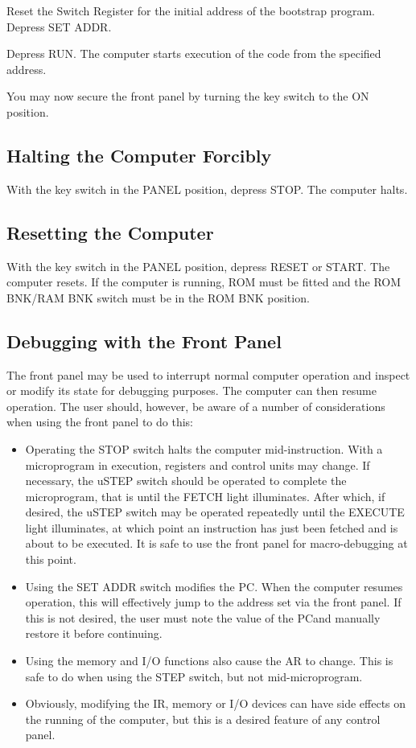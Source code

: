 \documentclass[11pt,a4paper,twocolumns]{article}
\newcommand{\lt}[1]{\textsf{#1}}
\newcommand{\sw}[1]{\textsf{#1}}
\newcommand\register[1]{\textsf{#1}}
\newcommand\MAR{\register{AR}}
\newcommand\PC{\register{PC}}
\newcommand\IR{\register{IR}}
\begin{document}
Reset the Switch Register for the initial address of the bootstrap
program. Depress \sw{SET ADDR}.

Depress \sw{RUN}. The computer starts execution of the code from the
specified address.

You may now secure the front panel by turning the key switch to the
\sw{ON} position.

\subsection{Halting the Computer Forcibly}

With the key switch in the \sw{PANEL} position, depress \sw{STOP}. The
computer halts.

\subsection{Resetting the Computer}

With the key switch in the \sw{PANEL} position, depress \sw{RESET} or
\sw{START}. The computer resets. If the computer is running, ROM must
be fitted and the \sw{ROM BNK}/\sw{RAM BNK} switch must be in the
\sw{ROM BNK} position.

\subsection{Debugging with the Front Panel}

The front panel may be used to interrupt normal computer operation and
inspect or modify its state for debugging purposes. The computer can
then resume operation. The user should, however, be aware of a number
of considerations when using the front panel to do this:

\begin{itemize}
\item Operating the \sw{STOP} switch halts the computer
  mid-instruction. With a microprogram in execution, registers and
  control units may change. If necessary, the \sw{uSTEP} switch should
  be operated to complete the microprogram, that is until the
  \lt{FETCH} light illuminates. After which, if desired, the
  \sw{uSTEP} switch may be operated repeatedly until the \lt{EXECUTE}
  light illuminates, at which point an instruction has just been
  fetched and is about to be executed. It is safe to use the front
  panel for macro-debugging at this point.
\item Using the \sw{SET ADDR} switch modifies the \PC. When the
  computer resumes operation, this will effectively jump to the
  address set via the front panel. If this is not desired, the user
  must note the value of the \PC and manually restore it before
  continuing.
\item Using the memory and I/O functions also cause the \MAR{} to
  change. This is safe to do when using the {\sf STEP} switch, but not
  mid-microprogram.
\item Obviously, modifying the \IR{}, memory or I/O devices can have
  side effects on the running of the computer, but this is a desired
  feature of any control panel.
\end{itemize}
\end{document}
